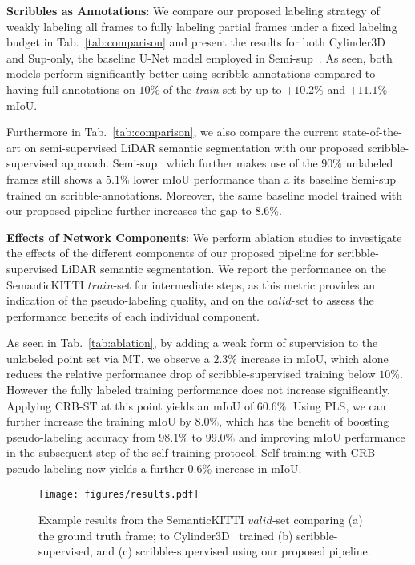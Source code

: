 \documentclass[10pt,twocolumn,letterpaper]{article}
\begin{document}
\noindent \textbf{Scribbles as Annotations}: 
We compare our proposed labeling strategy of weakly labeling all frames to fully labeling partial frames under a fixed labeling budget in Tab.~\ref{tab:comparison} and present the results for both Cylinder3D~\cite{cvpr2021cylindrical} and Sup-only, the baseline U-Net model employed in Semi-sup~\cite{iccv2021guided}. As seen, both models perform significantly better using scribble annotations compared to having full annotations on $10\%$ of the \textit{train}-set by up to $+10.2\%$ and $+11.1\%$ mIoU.

Furthermore in Tab.~\ref{tab:comparison}, we also compare the current state-of-the-art on semi-supervised LiDAR semantic segmentation with our proposed scribble-supervised approach. Semi-sup~\cite{iccv2021guided} which further makes use of the $90\%$ unlabeled frames still shows a $5.1\%$ lower mIoU performance than a its baseline Semi-sup trained on scribble-annotations. Moreover, the same baseline model trained with our proposed pipeline further increases the gap to $8.6\%$. 

\noindent \textbf{Effects of Network Components}: We perform ablation studies to investigate the effects of the different components of our proposed pipeline for scribble-supervised LiDAR semantic segmentation. We report the performance on the SemanticKITTI $train$-set for intermediate steps, as this metric provides an indication of the pseudo-labeling quality, and on the $valid$-set to assess the performance benefits of each individual component. 

As seen in Tab.~\ref{tab:ablation}, by adding a weak form of supervision to the unlabeled point set via MT, we observe a $2.3\%$ increase in mIoU, which alone reduces the relative performance drop of scribble-supervised training below $10\%$. However the fully labeled training performance does not increase significantly. Applying CRB-ST at this point yields an mIoU of $60.6\%$. Using PLS, we can further increase the training mIoU by $8.0\%$, which has the benefit of boosting pseudo-labeling accuracy from $98.1\%$ to $99.0\%$ and improving mIoU performance in the subsequent step of the self-training protocol. Self-training with CRB pseudo-labeling now yields a further $0.6\%$ increase in mIoU.

\begin{figure}[t]
    \centering
    \texttt{[image: figures/results.pdf]}
    \caption{Example results from the SemanticKITTI $valid$-set comparing (a) the ground truth frame; to Cylinder3D~\cite{cvpr2021cylindrical} trained (b) scribble-supervised, and  (c) scribble-supervised using our proposed pipeline.}
    \label{fig:results}
\vspace{-10px} \end{figure}
\end{document}
